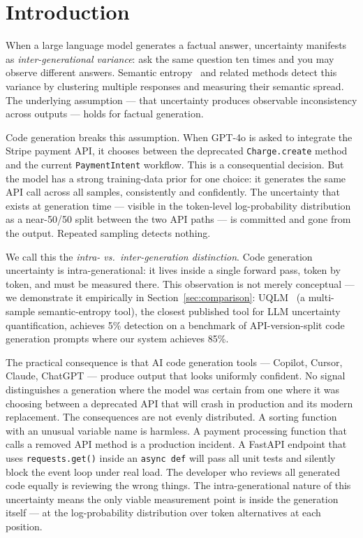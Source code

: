 \section{Introduction}
\label{sec:intro}

When a large language model generates a factual answer, uncertainty manifests
as \emph{inter-generational variance}: ask the same question ten times and you
may observe different answers. Semantic entropy~\cite{kuhn2023semantic} and
related methods detect this variance by clustering multiple responses and
measuring their semantic spread. The underlying assumption --- that uncertainty
produces observable inconsistency across outputs --- holds for factual
generation.

Code generation breaks this assumption. When GPT-4o is asked to integrate
the Stripe payment API, it chooses between the deprecated \texttt{Charge.create}
method and the current \texttt{PaymentIntent} workflow. This is a consequential
decision. But the model has a strong training-data prior for one choice: it
generates the same API call across all samples, consistently and confidently.
The uncertainty that exists at generation time --- visible in the token-level
log-probability distribution as a near-50/50 split between the two API paths
--- is committed and gone from the output. Repeated sampling detects nothing.

We call this the \emph{intra- vs.\ inter-generation distinction}.
Code generation uncertainty is intra-generational: it lives inside a single
forward pass, token by token, and must be measured there.
This observation is not merely conceptual --- we demonstrate it empirically
in Section~\ref{sec:comparison}: UQLM~\cite{uqlm2024} (a multi-sample
semantic-entropy tool), the closest published tool for LLM uncertainty
quantification, achieves 5\% detection on a benchmark of API-version-split
code generation prompts where our system achieves 85\%.

The practical consequence is that AI code generation tools --- Copilot, Cursor,
Claude, ChatGPT --- produce
output that looks uniformly confident. No signal distinguishes a generation
where the model was certain from one where it was choosing between a deprecated
API that will crash in production and its modern replacement.
The consequences are not evenly distributed. A sorting function with an unusual
variable name is harmless. A payment processing function that calls a removed
API method is a production incident. A FastAPI endpoint that uses
\texttt{requests.get()} inside an \texttt{async def} will pass all unit tests
and silently block the event loop under real load. The developer who reviews
all generated code equally is reviewing the wrong things.
The intra-generational nature of this uncertainty means the only viable
measurement point is inside the generation itself --- at the log-probability
distribution over token alternatives at each position.

